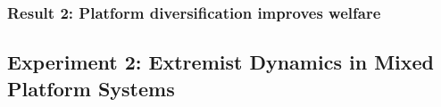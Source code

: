 \documentclass[12pt]{article}
\begin{document}
%
%
%

\subsubsection{Result 2: Platform diversification improves welfare}

%

\subsection{Experiment 2: Extremist Dynamics in Mixed Platform Systems}
\label{sec:results_exp2}

\end{document}
